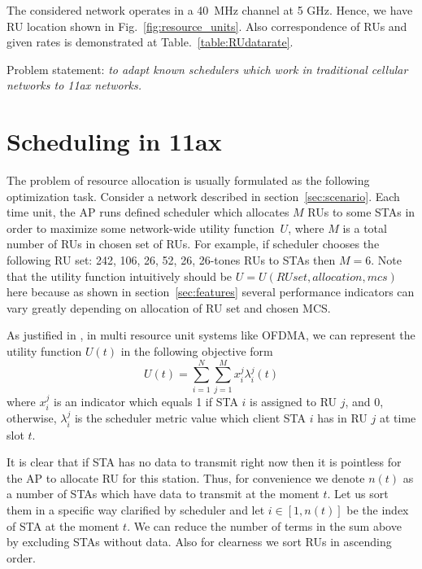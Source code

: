 The considered network operates in a \SI{40}{\MHz} channel at 5 GHz. Hence, we have RU location shown in Fig.~\ref{fig:resource_units}. 
Also correspondence of RUs and given rates is demonstrated at Table.~\ref{table:RUdatarate}.

Problem statement: \textit{to adapt known schedulers which work in traditional cellular networks to 11ax networks.}

\section{Scheduling in 11ax}
\label{sec:scheduling}

The problem of resource allocation is usually formulated as the following optimization task.
Consider a network described in section~\ref{sec:scenario}.
Each time unit, the AP runs defined scheduler which allocates $M$ RUs to some STAs in order to maximize some network-wide utility function~$U$, where $M$ is a total number of RUs in chosen set of RUs. 
For example, if scheduler chooses the following RU set: 242, 106, 26, 52, 26, 26-tones RUs to STAs then $M = 6$. 
Note that the utility function intuitively should be $U = U(RU set, allocation, mcs)$ here because as shown in section~\ref{sec:features} several performance indicators can vary greatly depending on allocation of RU set and chosen MCS.

As justified in \cite{andrews2010scheduling}, in multi resource unit systems like OFDMA, we can represent the utility function $U(t)$ in the following objective form
\begin{equation}
\label{eq:obj}
U(t) = \sum_{i = 1}^{N} \sum_{j = 1}^{M} x_i^j \lambda_i^j (t)
\end{equation}
where $x_i^j$ is an indicator which equals 1 if STA $i$ is assigned to RU $j$, and 0, otherwise, $\lambda_i^j$ is the scheduler metric value which client STA $i$ has in RU $j$ at time slot $t$. 

It is clear that if STA has no data to transmit right now then it is pointless for the AP to allocate RU for this station. Thus, for convenience we denote $n(t)$ as a number of STAs which have data to transmit at the moment $t$. Let us sort them in a specific way clarified by scheduler and let $i\in[1, n(t)]$ be the index of STA at the moment $t$. We can reduce the number of terms in the sum above by excluding STAs without data. Also for clearness we sort RUs in ascending order.


